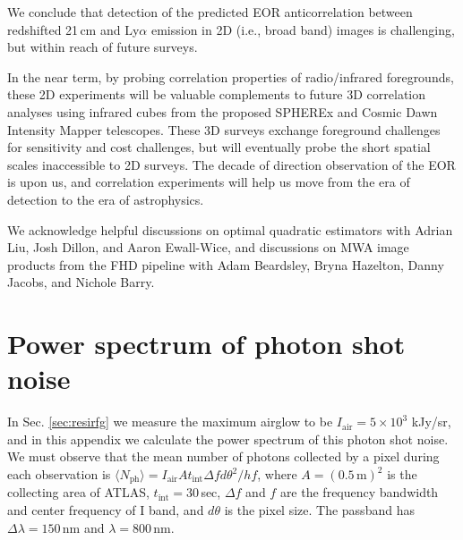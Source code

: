 \documentclass[numberedappendix]{emulateapj}
\begin{document}
We conclude that detection of the predicted EOR anticorrelation between redshifted 21\,cm and Ly$\alpha$ emission in 2D (i.e., broad band) images is challenging, but within reach of future surveys.

In the near term, by probing correlation properties of radio/infrared foregrounds, these 2D experiments will be valuable complements to future 3D correlation analyses using infrared cubes from the proposed SPHEREx and Cosmic Dawn Intensity Mapper telescopes. These 3D surveys exchange foreground challenges for sensitivity and cost challenges, but will eventually probe the short spatial scales inaccessible to 2D surveys. The decade of direction observation of the EOR is upon us, and correlation experiments will help us move from the era of detection to the era of astrophysics.

\begin{acknowledgments}
We acknowledge helpful discussions on optimal quadratic estimators with Adrian Liu, Josh Dillon, and Aaron Ewall-Wice, and discussions on MWA image products from the FHD pipeline with Adam Beardsley, Bryna Hazelton, Danny Jacobs, and Nichole Barry. 
\end{acknowledgments}

\appendix

\section{Power spectrum of photon shot noise}
\label{sec:Pshot}

In Sec. \ref{sec:resirfg} we measure the maximum airglow to be $I_\text{air}=5\times10^3$ kJy/sr, and in this appendix we calculate the power spectrum of this photon shot noise. We must observe that the mean number of photons collected by a pixel during each observation is $\langle N_\text{ph}\rangle=I_\text{air}At_\text{int} \Delta f d\theta^2/hf$, where $A=(0.5\,\text{m})^2$ is the collecting area of ATLAS, $t_\text{int}=30\,$sec, $\Delta f$ and $f$ are the frequency bandwidth and center frequency of I band, and $d\theta$ is the pixel size. The passband has $\Delta\lambda=150\,$nm and $\lambda=800\,$nm. 
\end{document}
